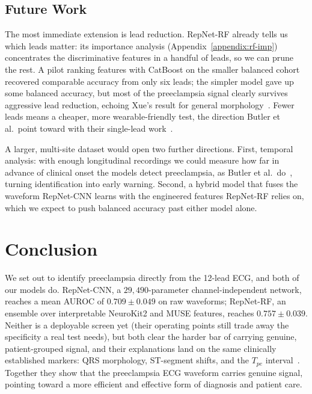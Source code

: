 \documentclass[sigconf,nonacm]{acmart}
\begin{document}
\subsection{Future Work}
\label{sec:future}

The most immediate extension is lead reduction. RepNet-RF already tells us
which leads matter: its importance analysis (Appendix~\ref{appendix:rf-imp})
concentrates the discriminative features in a handful of leads, so we can
prune the rest. A pilot ranking features with CatBoost on the smaller balanced
cohort recovered comparable accuracy from only six leads; the simpler model
gave up some balanced accuracy, but most of the preeclampsia signal clearly
survives aggressive lead reduction, echoing Xue's result for general
morphology~\cite{xue_does_2024}. Fewer leads means a cheaper, more
wearable-friendly test, the direction Butler et al.\ point toward with their
single-lead work~\cite{butler_feasibility_2024}.

A larger, multi-site dataset would open two further directions. First,
temporal analysis: with enough longitudinal recordings we could measure how
far in advance of clinical onset the models detect preeclampsia, as Butler et
al.\ do~\cite{butler_ai-based_2024}, turning identification into early warning.
Second, a hybrid model that fuses the waveform RepNet-CNN learns with the
engineered features RepNet-RF relies on, which we expect to push balanced
accuracy past either model alone.

\section{Conclusion}
\label{sec:conclusion}

We set out to identify preeclampsia directly from the 12-lead ECG, and both
of our models do. RepNet-CNN, a $29{,}490$-parameter channel-independent
network, reaches a mean AUROC of $0.709 \pm 0.049$ on raw waveforms;
RepNet-RF, an ensemble over interpretable NeuroKit2 and MUSE features, reaches
$0.757 \pm 0.039$. Neither is a deployable screen yet (their operating
points still trade away the specificity a real test needs), but both clear
the harder bar of carrying genuine, patient-grouped signal, and their
explanations land on the same clinically established markers: QRS morphology,
ST-segment shifts, and the $T_{pe}$ interval~\cite{surawicz_chous_2008, raffaelli_pre-eclampsia_2014}. Together they show that the
preeclampsia ECG waveform carries genuine signal, pointing toward a more
efficient and effective form of diagnosis and patient care.
\end{document}
